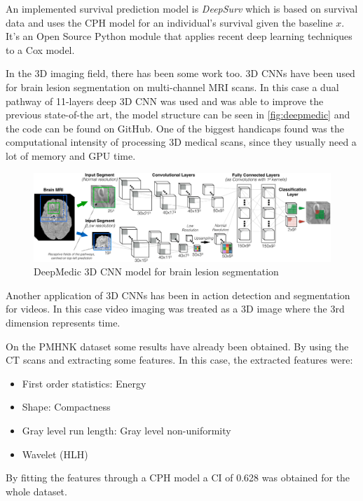 An implemented survival prediction model is \emph{DeepSurv} which is based on survival data
and uses the \gls{CPH} model for an individual's survival given the \gls{baseline}
\( x \). It's an Open Source Python module that applies recent deep learning techniques 
to a Cox model.
~\cites{medical:deep-surv}{medical:cox}

In the 3D imaging field, there has been some work too. 3D \glspl{CNN} have
been used for brain lesion segmentation on multi-channel \gls{MRI} scans. In this case a 
dual pathway of 11-layers deep 3D \gls{CNN} was used and was able to improve the previous
state-of-the art, the model structure can be seen in \autoref{fig:deepmedic} and the code 
can be found on GitHub. 
One of the biggest handicaps found was the computational intensity of
processing 3D medical scans, since they usually need a lot of memory and GPU time.
~\cites{neural:deepmedic}{neural:3d-cnn-crf}

\begin{figure}
  \centering
  \includegraphics[width=\textwidth]{images/deepmedic}

  \caption[DeepMedic 3D CNN model]{
    DeepMedic 3D \acrshort{CNN} model for brain lesion segmentation \cite{neural:3d-cnn-crf}
    \label{fig:deepmedic}
  }
\end{figure}

Another application of 3D \glspl{CNN} has been in action detection and segmentation for videos.
In this case video imaging was treated as a 3D image where the 3rd dimension represents
time.
~\cite{neural:3d-cnn-action-detection}

On the \gls{PMHNK} dataset some results have already been obtained. By using the \gls{CT} scans and
extracting some features. In this case, the extracted features were:
\begin{itemize}
  \item First order statistics: Energy
  \item Shape: Compactness
  \item Gray level run length: Gray level non-uniformity
  \item Wavelet (HLH) 
\end{itemize}
By fitting the features through a \gls{CPH} model a \gls{CI} of 0.628 was obtained for the whole
dataset.
~\cite{medical:ct-based-radiomic-signature}

